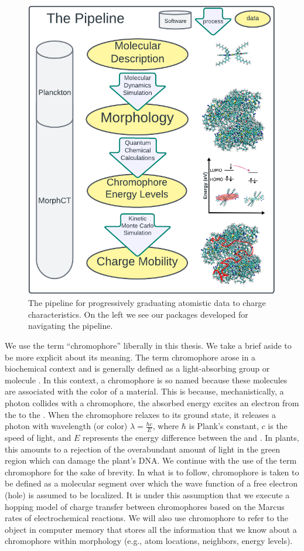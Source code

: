 \begin{figure}
  \center
  \includegraphics[width=0.9\linewidth]{figures/the-pipeline.png} 
    \caption{The pipeline for progressively graduating atomistic data to charge characteristics. On the left
    we see our packages developed for navigating the pipeline.}
  \label{pipeline}
\end{figure}

We use the term ``chromophore'' liberally in this thesis. We take a brief aside to be more
explicit about its meaning.  
The term chromophore arose in a biochemical context and is generally defined
as a light-absorbing group or molecule \cite{biochemistry}.
In this context, a chromophore is so named because these molecules are associated with the color of a material.
This is because, mechanistically, a photon collides with a chromophore, the absorbed energy
excites an electron from the  to the
. When the chromophore relaxes to its
ground state, it releases a photon with wavelength (or color) $\lambda = \frac{\hbar c}{E}$,
where $\hbar$ is Plank's constant, $c$ is the speed of light, and $E$ represents the
energy difference between the  and . 
In plants, this amounts to a rejection of the overabundant amount of
light in the green region which can damage the plant's DNA. 
We continue with the use of the term chromophore
for the sake of brevity. In what is to follow, chromophore is taken to be defined as a molecular segment over which the 
wave function of a free electron (hole) is assumed to be localized.
It is under this assumption that we execute a hopping model of charge transfer between
chromophores based on the Marcus rates of electrochemical reactions. We will also use chromophore to refer to
the object in computer memory that stores all the information that we know about a chromophore within morphology
(e.g., atom locations, neighbors, energy levels).

